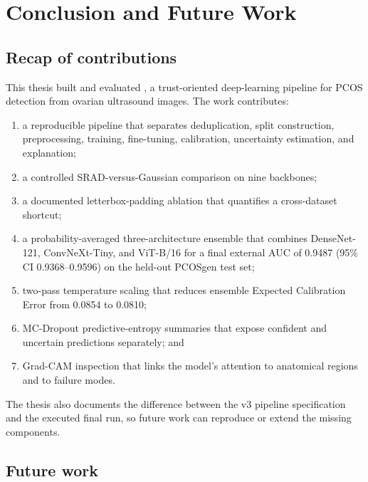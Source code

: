 \documentclass[../preamble.tex]{subfiles}
\begin{document}
\chapter{Conclusion and Future Work}
\label{ch:conclusion}

\section{Recap of contributions}
\label{sec:conclusion-recap}

This thesis built and evaluated \PEARL{}, a trust-oriented deep-learning
pipeline for PCOS detection from ovarian ultrasound images. The work
contributes:

\begin{enumerate}
  \item a reproducible pipeline that separates deduplication, split
        construction, preprocessing, training, fine-tuning, calibration,
        uncertainty estimation, and explanation;
  \item a controlled SRAD-versus-Gaussian comparison on nine backbones;
  \item a documented letterbox-padding ablation that quantifies a
        cross-dataset shortcut;
  \item a probability-averaged three-architecture ensemble that combines
        DenseNet-121, ConvNeXt-Tiny, and ViT-B/16 for a final external AUC
        of 0.9487 (95\% CI 0.9368--0.9596) on the held-out PCOSgen test set;
  \item two-pass temperature scaling that reduces ensemble Expected
        Calibration Error from 0.0854 to 0.0810;
  \item MC-Dropout predictive-entropy summaries that expose confident and
        uncertain predictions separately; and
  \item Grad-CAM inspection that links the model's attention to anatomical
        regions and to failure modes.
\end{enumerate}

The thesis also documents the difference between the v3 pipeline
specification and the executed final run, so future work can reproduce or
extend the missing components.

\section{Future work}
\label{sec:conclusion-future}
\end{document}

